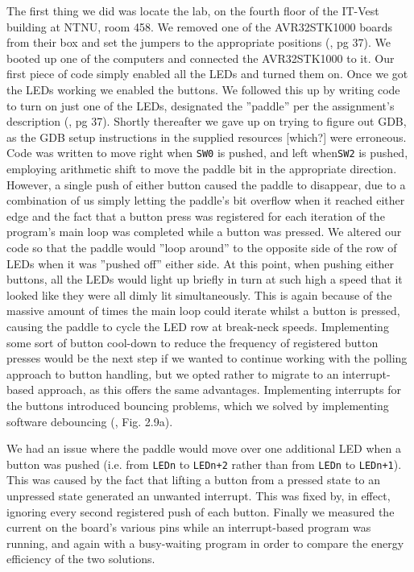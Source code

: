 The first thing we did was locate the lab, on the fourth floor of the IT-Vest building at NTNU, room 458. 
We removed one of the AVR32STK1000 boards from their box and set the jumpers to the appropriate positions (\cite{lab-compendium}, pg 37).
We booted up one of the computers and connected the AVR32STK1000 to it. 
Our first piece of code simply enabled all the LEDs and turned them on. Once we got the LEDs working we enabled the buttons.
We followed this up by writing code to turn on just one of the LEDs, designated the ''paddle'' per the assignment's description (\cite{lab-compendium}, pg 37).
Shortly thereafter we gave up on trying to figure out GDB, as the GDB setup instructions in the supplied resources [which?] were erroneous.
Code was written to move right when \texttt{SW0} is pushed, and left when\texttt{SW2} is pushed, employing arithmetic shift to move the paddle bit in the appropriate direction.
However, a single push of either button caused the paddle to disappear, due to a combination of us simply letting the paddle's bit overflow when it reached either edge and the fact that a button press was registered for each  iteration of the program's main loop was completed while a button was pressed.
We altered our code so that the paddle would ''loop around'' to the opposite side of the row of LEDs when it was ''pushed off'' either side.
At this point, when pushing either buttons, all the LEDs would light up briefly in turn at such high a speed that it looked like they were all dimly lit simultaneously.
This is again because of the massive amount of times the main loop could iterate whilst a button is pressed, causing the paddle to cycle the LED row at break-neck speeds.
Implementing some sort of button cool-down to reduce the frequency of registered button presses would be the next step if we wanted to continue working with the polling approach to button handling, but we opted rather to migrate to an interrupt-based approach, as this offers the same advantages.
Implementing interrupts for the buttons introduced bouncing problems, which we solved by implementing software debouncing (\cite{lab-compendium}, Fig. 2.9a).

We had an issue where the paddle would move over one additional LED when a button was pushed (i.e. from \texttt{LEDn} to \texttt{LEDn+2} rather than from \texttt{LEDn} to \texttt{LEDn+1}).
This was caused by the fact that lifting a button from a pressed state to an unpressed state generated an unwanted interrupt.
This was fixed by, in effect, ignoring every second registered push of each button.
Finally we measured the current on the board's various pins while an interrupt-based program was running, and again with a busy-waiting program in order to compare the energy efficiency of the two solutions.
